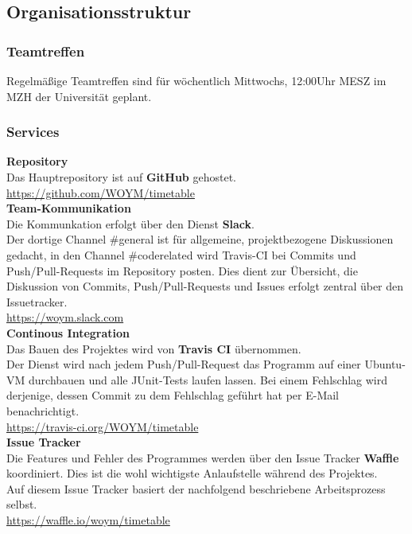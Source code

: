\documentclass[fontsize=12pt,paper=a4,twoside]{scrartcl}
\begin{document}
\subsection{Organisationsstruktur}

\subsubsection{Teamtreffen}

	Regelmäßige Teamtreffen sind für wöchentlich Mittwochs, 12:00Uhr MESZ im MZH der Universität geplant.\\

\subsubsection{Services}
	\textbf{Repository}\\ 
	Das Hauptrepository ist auf \textbf{GitHub} gehostet.\\
	\url{https://github.com/WOYM/timetable}
	 \\[1\baselineskip]
	 
 	\textbf{Team-Kommunikation}\\ 
	Die Kommunkation erfolgt über den Dienst \textbf{Slack}.\\
	Der dortige Channel \#general ist für allgemeine, projektbezogene Diskussionen gedacht, in den Channel \#coderelated wird Travis-CI bei Commits und Push/Pull-Requests im Repository posten. Dies dient zur Übersicht, die Diskussion von Commits, Push/Pull-Requests und Issues erfolgt zentral über den Issuetracker.\\
 	\url{https://woym.slack.com}
 	\\[1\baselineskip]
	  
	\textbf{Continous Integration}\\ 
	Das Bauen des Projektes wird von \textbf{Travis CI} übernommen.\\
	Der Dienst wird nach jedem Push/Pull-Request das Programm auf einer Ubuntu-VM durchbauen und alle JUnit-Tests laufen lassen. Bei einem Fehlschlag wird derjenige, dessen Commit zu dem Fehlschlag geführt hat per E-Mail benachrichtigt.\\
	\url{https://travis-ci.org/WOYM/timetable}
	\\[1\baselineskip]
	
	\textbf{Issue Tracker}\\ 
	Die Features und Fehler des Programmes werden über den Issue Tracker \textbf{Waffle} koordiniert. Dies ist die wohl wichtigste Anlaufstelle während des Projektes.\\
	Auf diesem Issue Tracker basiert der nachfolgend beschriebene Arbeitsprozess selbst.\\
	\url{https://waffle.io/woym/timetable}
	\\[1\baselineskip]
  
\end{document}
